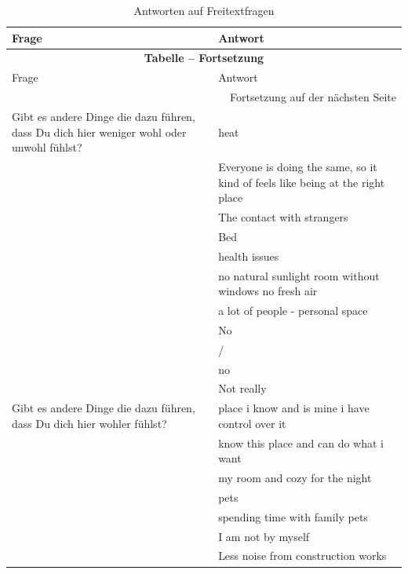 \begin{appendices}
\footnotesize
\begin{longtable}{p{5.5cm}p{9.5cm}}
    \caption{Antworten auf Freitextfragen}
    \label{tab:freitext}\\
    \toprule
    Frage & Antwort \\
    \midrule
    \endfirsthead

    \multicolumn{2}{c}{{\bfseries Tabelle \thetable{} -- Fortsetzung}} \\
    \toprule
    Frage & Antwort \\
    \midrule
    \endhead
    
    \midrule
    \multicolumn{2}{r}{Fortsetzung auf der nächsten Seite}\\
    \endfoot
    
    \bottomrule
    \endlastfoot

    Gibt es andere Dinge die dazu führen, dass Du dich hier weniger wohl oder unwohl fühlst? & heat \\*
     & Everyone is doing the same, so it kind of feels like being at the right place \\*
     & The contact with strangers \\*
     & Bed \\*
     & health issues \\*
     & no natural sunlight room without windows no fresh air \\*
     & a lot of people - personal space \\*
     & No \\*
     & / \\*
     & no \\*
     & Not really \\
    \midrule
    \addlinespace
    Gibt es andere Dinge die dazu führen, dass Du dich hier wohler fühlst? & place i know and is mine i have control over it \\*
     & know this place and can do what i want \\*
     & my room and cozy for the night \\*
     & pets \\*
     & spending time with family pets \\*
     & I am not by myself \\*
     & Less noise from construction works \\
    \bottomrule
\end{longtable}
\normalsize





\end{appendices}